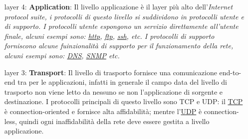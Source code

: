 \begin{enumerate} %
    \item[layer 4:] \textbf{Application}: Il livello applicazione è il layer pi\`u alto dell'\it{Internet protocol suite}, i protocolli di questo livello si suddividono in protocolli utente e di supporto. \newline
    I protocolli utente espongono un servizio direttamente all'utente finale, alcuni esempi sono: \href{https://en.wikipedia.org/wiki/Hypertext_Transfer_Protocol}{http}, \href{https://en.wikipedia.org/wiki/File_Transfer_Protocol}{ftp}, \href{https://en.wikipedia.org/wiki/Secure_Shell}{ssh}, etc. \newline
    I protocolli di supporto forniscono alcune fuinzionalità di supporto per il funzionamento della rete, alcuni esempi sono: \href{https://en.wikipedia.org/wiki/Domain_Name_System}{DNS}, \href{https://en.wikipedia.org/wiki/Simple_Network_Management_Protocol}{SNMP} etc.



    \item[layer 3:] \textbf{Transport}: Il livello di trasporto fornisce una comunicazione end-to-end tra per le applicazioni, infatti in generale il campo data del livello di trasporto non viene letto da nessuno se non l'applicazione di sorgente e destinazione. \newline
    I protocolli principali di questo livello sono TCP e UDP: il \href{https://en.wikipedia.org/wiki/Transmission_Control_Protocol}{TCP} è connection-oriented e fornisce alta affidabilità; mentre l'\href{https://en.wikipedia.org/wiki/User_Datagram_Protocol}{UDP} è connection-less, quindi ogni inaffidabilità della rete deve essere gestita a livello applicazione.
    

\end{enumerate}
